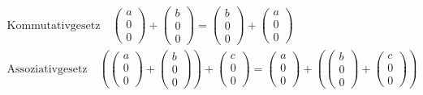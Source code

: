 \begin{gather*}
  \text{Kommutativgesetz}\quad \begin{pmatrix}a \\ 0 \\ 0\end{pmatrix} + \begin{pmatrix}b \\ 0 \\ 0\end{pmatrix} = \begin{pmatrix}b \\ 0 \\ 0\end{pmatrix} + \begin{pmatrix}a \\ 0 \\ 0\end{pmatrix} \\
  \text{Assoziativgesetz}\quad \left(\begin{pmatrix}a \\ 0 \\ 0\end{pmatrix} + \begin{pmatrix}b \\ 0 \\ 0\end{pmatrix}\right) + \begin{pmatrix}c \\ 0 \\ 0\end{pmatrix} = \begin{pmatrix}a \\ 0 \\ 0\end{pmatrix} + \left(\begin{pmatrix}b \\ 0 \\ 0\end{pmatrix} + \begin{pmatrix}c \\ 0 \\ 0\end{pmatrix}\right)
\end{gather*}
